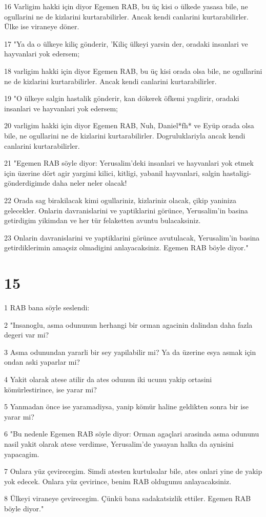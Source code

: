 \par 16 Varligim hakki için diyor Egemen RAB, bu üç kisi o ülkede yasasa bile, ne ogullarini ne de kizlarini kurtarabilirler. Ancak kendi canlarini kurtarabilirler. Ülke ise viraneye döner.
\par 17 "Ya da o ülkeye kiliç gönderir, 'Kiliç ülkeyi yarsin der, oradaki insanlari ve hayvanlari yok edersem;
\par 18 varligim hakki için diyor Egemen RAB, bu üç kisi orada olsa bile, ne ogullarini ne de kizlarini kurtarabilirler. Ancak kendi canlarini kurtarabilirler.
\par 19 "O ülkeye salgin hastalik gönderir, kan dökerek öfkemi yagdirir, oradaki insanlari ve hayvanlari yok edersem;
\par 20 varligim hakki için diyor Egemen RAB, Nuh, Daniel*fh* ve Eyüp orada olsa bile, ne ogullarini ne de kizlarini kurtarabilirler. Dogruluklariyla ancak kendi canlarini kurtarabilirler.
\par 21 "Egemen RAB söyle diyor: Yerusalim'deki insanlari ve hayvanlari yok etmek için üzerine dört agir yargimi kilici, kitligi, yabanil hayvanlari, salgin hastaligi- gönderdigimde daha neler neler olacak!
\par 22 Orada sag birakilacak kimi ogullariniz, kizlariniz olacak, çikip yaniniza gelecekler. Onlarin davranislarini ve yaptiklarini görünce, Yerusalim'in basina getirdigim yikimdan ve her tür felaketten avuntu bulacaksiniz.
\par 23 Onlarin davranislarini ve yaptiklarini görünce avutulacak, Yerusalim'in basina getirdiklerimin amaçsiz olmadigini anlayacaksiniz. Egemen RAB böyle diyor."

\chapter{15}

\par 1 RAB bana söyle seslendi:
\par 2 "Insanoglu, asma odununun herhangi bir orman agacinin dalindan daha fazla degeri var mi?
\par 3 Asma odunundan yararli bir sey yapilabilir mi? Ya da üzerine esya asmak için ondan aski yaparlar mi?
\par 4 Yakit olarak atese atilir da ates odunun iki ucunu yakip ortasini kömürlestirince, ise yarar mi?
\par 5 Yanmadan önce ise yaramadiysa, yanip kömür haline geldikten sonra bir ise yarar mi?
\par 6 "Bu nedenle Egemen RAB söyle diyor: Orman agaçlari arasinda asma odununu nasil yakit olarak atese verdimse, Yerusalim'de yasayan halka da aynisini yapacagim.
\par 7 Onlara yüz çevirecegim. Simdi atesten kurtulsalar bile, ates onlari yine de yakip yok edecek. Onlara yüz çevirince, benim RAB oldugumu anlayacaksiniz.
\par 8 Ülkeyi viraneye çevirecegim. Çünkü bana sadakatsizlik ettiler. Egemen RAB böyle diyor."

